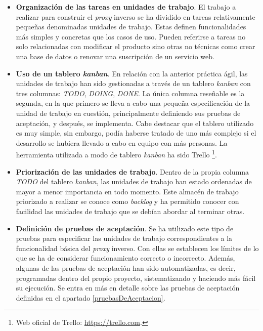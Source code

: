 \documentclass[11pt,spanish,listoffigures]{tfgetsinf}
\begin{document}
\begin{itemize}

	\item \textbf{Organización de las tareas en unidades de trabajo}. El trabajo a realizar para construir el \emph{proxy} inverso se ha dividido en tareas relativamente pequeñas denominadas unidades de trabajo. Estas definen funcionalidades más simples y concretas que los casos de uso. Pueden referirse a tareas no solo relacionadas con modificar el producto sino otras no técnicas como crear una base de datos o renovar una suscripción de un servicio web.

	\item \textbf{Uso de un tablero \emph{kanban}}. En relación con la anterior práctica ágil, las unidades de trabajo han sido gestionadas a través de un tablero \emph{kanban} con tres columnas: \emph{TODO}, \emph{DOING}, \emph{DONE}. La única columna reseñable es la segunda, en la que primero se lleva a cabo una pequeña especificación de la unidad de trabajo en cuestión, principalmente definiendo sus pruebas de aceptación, y después, se implementa. Cabe destacar que el tablero utilizado es muy simple, sin embargo, podía haberse tratado de uno más complejo si el desarrollo se hubiera llevado a cabo en equipo con más personas. La herramienta utilizada a modo de tablero \emph{kanban} ha sido Trello \footnote{Web oficial de Trello: \url{https://trello.com}.}.

	\item \textbf{Priorización de las unidades de trabajo}. Dentro de la propia columna \emph{TODO} del tablero \emph{kanban}, las unidades de trabajo han estado ordenadas de mayor a menor importancia en todo momento. Este almacén de trabajo priorizado a realizar se conoce como \emph{backlog} y ha permitido conocer con facilidad las unidades de trabajo que se debían abordar al terminar otras.

	\item \textbf{Definición de pruebas de aceptación}. Se ha utilizado este tipo de pruebas para especificar las unidades de trabajo correspondientes a la funcionalidad básica del \emph{proxy} inverso. Con ellas se establecen los límites de lo que se ha de considerar funcionamiento correcto o incorrecto. Además, algunas de las pruebas de aceptación han sido automatizadas, es decir, programadas dentro del propio proyecto, sistematizando y haciendo más fácil su ejecución. Se entra en más en detalle sobre las pruebas de aceptación definidas en el apartado \ref{pruebasDeAceptacion}.


\end{itemize}
\end{document}
